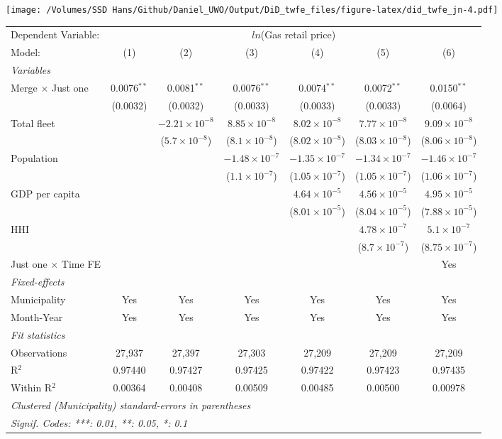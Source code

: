 \documentclass[
]{article}
\begin{document}
\texttt{[image: /Volumes/SSD Hans/Github/Daniel\_UWO/Output/DiD\_twfe\_files/figure-latex/did\_twfe\_jn-4.pdf]}

\begin{tabular}{lcccccc}
\tabularnewline\midrule\midrule
Dependent Variable:&\multicolumn{6}{c}{$ln$(Gas retail price)}\\
Model:&(1) & (2) & (3) & (4) & (5) & (6)\\
\midrule \emph{Variables}&   &   &   &   &   &  \\
Merge $\times $ Just one & 0.0076$^{**}$ & 0.0081$^{**}$ & 0.0076$^{**}$ & 0.0074$^{**}$ & 0.0072$^{**}$ & 0.0150$^{**}$\\
  &(0.0032) & (0.0032) & (0.0033) & (0.0033) & (0.0033) & (0.0064)\\
Total fleet &    & $-2.21\times 10^{-8}$ & $8.85\times 10^{-8}$ & $8.02\times 10^{-8}$ & $7.77\times 10^{-8}$ & $9.09\times 10^{-8}$\\
  &   & ($5.7\times 10^{-8}$) & ($8.1\times 10^{-8}$) & ($8.02\times 10^{-8}$) & ($8.03\times 10^{-8}$) & ($8.06\times 10^{-8}$)\\
Population &    &    & $-1.48\times 10^{-7}$ & $-1.35\times 10^{-7}$ & $-1.34\times 10^{-7}$ & $-1.46\times 10^{-7}$\\
  &   &    & ($1.1\times 10^{-7}$) & ($1.05\times 10^{-7}$) & ($1.05\times 10^{-7}$) & ($1.06\times 10^{-7}$)\\
GDP per capita &    &    &    & $4.64\times 10^{-5}$ & $4.56\times 10^{-5}$ & $4.95\times 10^{-5}$\\
  &   &    &    & ($8.01\times 10^{-5}$) & ($8.04\times 10^{-5}$) & ($7.88\times 10^{-5}$)\\
HHI &    &    &    &    & $4.78\times 10^{-7}$ & $5.1\times 10^{-7}$\\
  &   &    &    &    & ($8.7\times 10^{-7}$) & ($8.75\times 10^{-7}$)\\
Just one $\times$ Time FE &  &  &  &  &  & Yes\\
\midrule \emph{Fixed-effects}&   &   &   &   &   &  \\
Municipality & Yes & Yes & Yes & Yes & Yes & Yes\\
Month-Year & Yes & Yes & Yes & Yes & Yes & Yes\\
\midrule \emph{Fit statistics}&  & & & & & \\
Observations & 27,937&27,397&27,303&27,209&27,209&27,209\\
R$^2$ & 0.97440&0.97427&0.97425&0.97422&0.97423&0.97435\\
Within R$^2$ & 0.00364&0.00408&0.00509&0.00485&0.00500&0.00978\\
\midrule\midrule\multicolumn{7}{l}{\emph{Clustered (Municipality) standard-errors in parentheses}}\\
\multicolumn{7}{l}{\emph{Signif. Codes: ***: 0.01, **: 0.05, *: 0.1}}\\
\end{tabular}
\end{document}
